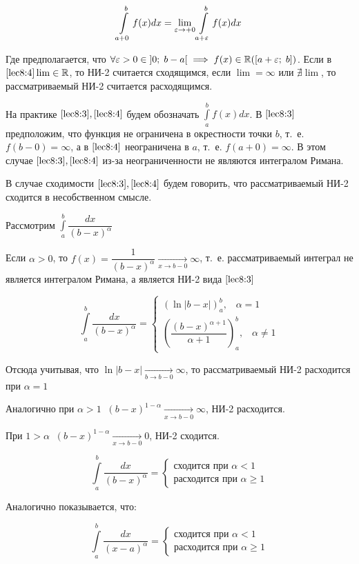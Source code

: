 \documentclass[../../main.tex]{subfiles}
\begin{document}
\begin{equation} \label{lec8:4}
 \int\limits_{a + 0}^{b}f(x)dx = \underset{\varepsilon \to +0}\lim \int\limits_{a + 
 \varepsilon}^{b}f(x)dx
\end{equation}

Где предполагается, что $\forall \varepsilon > 0 \in \left]0;\; b - a\right[ \implies 
f(x) \in \mathbb{R}(\left[a + \varepsilon;\; b\right])$. Если в $\eqref{lec8:4} \lim \in \mathbb{R}$, 
то НИ-2 считается сходящимся, если $\lim = \infty$ или $\nexists \lim$, то 
рассматриваемый НИ-2 считается расходящимся.

На практике $\eqref{lec8:3}, \eqref{lec8:4}$ будем обозначать 
$\displaystyle\int\limits_{a}^{b}f(x)dx$. В $\eqref{lec8:3}$ предположим, что 
функция не ограничена в окрестности точки $b$, т.~е. $f(b - 0) = \infty$, а в 
$\eqref{lec8:4}$ неограничена в $a$, т.~е. $f(a + 0) = \infty$. В этом случае 
$\eqref{lec8:3}, \eqref{lec8:4}$ из-за неограниченности не являются интегралом 
Римана.

В случае сходимости $\eqref{lec8:3}, \eqref{lec8:4}$ будем говорить, что 
рассматриваемый НИ-2 сходится в несобственном смысле.

\begin{exmp}
 Рассмотрим $\displaystyle\int\limits_{a}^{b}\dfrac{dx}{(b - x)^{\alpha}}$
 
 Если $\alpha > 0$, то $f(x) = \dfrac{1}{(b -x)^{\alpha}} \xrightarrow[x \to b 
 - 0]{} \infty$, т.~е. рассматриваемый интеграл не является интегралом Римана, 
 а является НИ-2 вида $\eqref{lec8:3}$
 
 \[\int\limits_{a}^{b}\dfrac{dx}{(b - x)^{\alpha}} =
 \begin{cases}
 \left(\ln|b - x|\right)_{a}^{b},\;\;\; \alpha = 1\\
 \left(\dfrac{(b - x)^{\alpha + 1}}{\alpha + 1}\right)_{a}^{b},\;\;\; \alpha 
 \neq 1 
\end{cases}\]

Отсюда учитывая, что $\ln|b - x| \xrightarrow[b \to b - 0]{} \infty$, то 
рассматриваемый НИ-2 расходится при $\alpha = 1$

Аналогично при $\alpha > 1 \;\;(b - x)^{1- \alpha} \xrightarrow[x \to b - 0]{} 
\infty$, НИ-2 расходится.

При $1 > \alpha \;\; (b - x)^{1 - \alpha} \xrightarrow[x \to b - 0]{} 0$, НИ-2 
сходится.

\[\int\limits_{a}^{b} \dfrac{dx}{(b - x)^{\alpha}} = 
\begin{cases}
\text{сходится при } \alpha < 1\\
\text{расходится при } \alpha \geq 1
\end{cases}\]

Аналогично показывается, что:

\[\int\limits_{a}^{b} \dfrac{dx}{(x - a)^{\alpha}} = 
\begin{cases}
\text{сходится при } \alpha < 1\\
\text{расходится при } \alpha \geq 1
\end{cases}\]
\end{exmp}
\end{document}
